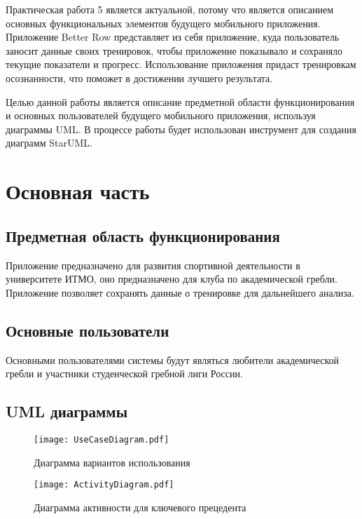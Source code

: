 \documentclass[14pt]{extreport}
\begin{document}
\pagestyle{empty}

\pagestyle{plain}

\tableofcontents

\intro

Практическая работа 5 является актуальной, потому что является описанием основных функциональных элементов будущего мобильного приложения. Приложение Better Row представляет из себя приложение, куда пользователь заносит данные своих тренировок, чтобы приложение показывало и сохраняло текущие показатели и прогресс. Использование приложения придаст тренировкам осознанности, что поможет в достижении лучшего результата.

Целью данной работы является описание предметной области функционирования и основных пользователей будущего мобильного приложения, используя диаграммы UML. В процессе работы будет использован инструмент для создания диаграмм StarUML.

\chapter{Основная часть}

\section{Предметная область функционирования}

Приложение предназначено для развития спортивной деятельности в университете ИТМО, оно предназначено для клуба по академической гребли. Приложение позволяет сохранять данные о тренировке для дальнейшего анализа.

\section{Основные пользователи}

Основными пользователями системы будут являться любители академической гребли и участники студенческой гребной лиги России.

\section{UML диаграммы}

\begin{figure}[H]
\centerline{\texttt{[image: UseCaseDiagram.pdf]}}
\caption{Диаграмма вариантов использования}
\label{fig11}
\end{figure}

\begin{figure}[H]
\centerline{\texttt{[image: ActivityDiagram.pdf]}}
\caption{Диаграмма активности для ключевого прецедента}
\label{fig12}
\end{figure}
\end{document}

